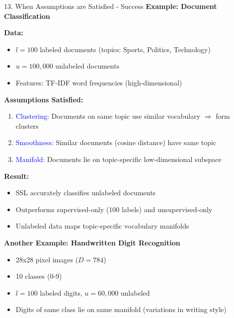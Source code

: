 \documentclass[8pt]{beamer}
\begin{document}
	\begin{frame}{13. When Assumptions are Satisfied - Success}
		\fontsize{6.5}{7.5}\selectfont
		\textbf{Example: Document Classification}
		
		\textbf{Data:}
		\begin{itemize}
			\item $l = 100$ labeled documents (topics: Sports, Politics, Technology)
			\item $u = 100,000$ unlabeled documents
			\item Features: TF-IDF word frequencies (high-dimensional)
		\end{itemize}
		
		\textbf{Assumptions Satisfied:}
		\begin{enumerate}
			\item \textcolor{blue}{Clustering:} Documents on same topic use similar vocabulary $\Rightarrow$ form clusters
			\item \textcolor{blue}{Smoothness:} Similar documents (cosine distance) have same topic
			\item \textcolor{blue}{Manifold:} Documents lie on topic-specific low-dimensional subspace
		\end{enumerate}
		
		\textbf{Result:}
		\begin{itemize}
			\item SSL accurately classifies unlabeled documents
			\item Outperforms supervised-only (100 labels) and unsupervised-only
			\item Unlabeled data maps topic-specific vocabulary manifolds
		\end{itemize}
		
		\textbf{Another Example: Handwritten Digit Recognition}
		\begin{itemize}
			\item 28x28 pixel images ($D=784$)
			\item 10 classes (0-9)
			\item $l = 100$ labeled digits, $u = 60,000$ unlabeled
			\item Digits of same class lie on same manifold (variations in writing style)
		\end{itemize}
	\end{frame}
	
\end{document}
